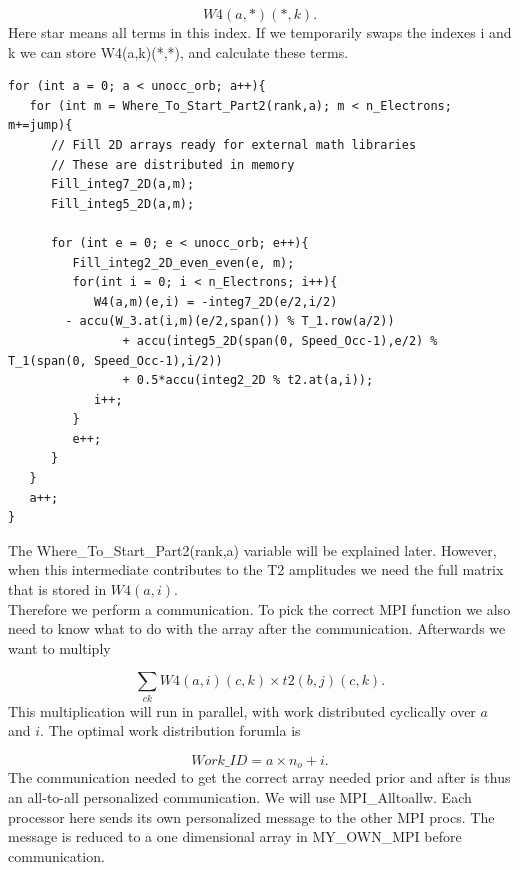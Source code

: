 \documentclass[a4paper,norsk,11pt,twoside]{report}
\begin{document}
\begin{equation}
W4(a,*)(*,k) .
\end{equation}
Here star means all terms in this index. If we temporarily swaps the indexes i and k we can store W4(a,k)(*,*), and calculate these terms.

\begin{lstlisting}
for (int a = 0; a < unocc_orb; a++){
   for (int m = Where_To_Start_Part2(rank,a); m < n_Electrons; m+=jump){
      // Fill 2D arrays ready for external math libraries
      // These are distributed in memory
      Fill_integ7_2D(a,m);
      Fill_integ5_2D(a,m);

      for (int e = 0; e < unocc_orb; e++){
         Fill_integ2_2D_even_even(e, m);
         for(int i = 0; i < n_Electrons; i++){
            W4(a,m)(e,i) = -integ7_2D(e/2,i/2)
        - accu(W_3.at(i,m)(e/2,span()) % T_1.row(a/2))
                + accu(integ5_2D(span(0, Speed_Occ-1),e/2) % T_1(span(0, Speed_Occ-1),i/2))
                + 0.5*accu(integ2_2D % t2.at(a,i));
            i++;
         }
         e++;
      }
   }
   a++;
}
\end{lstlisting}

The Where\_To\_Start\_Part2(rank,a) variable will be explained later. However, when this intermediate contributes to the T2 amplitudes we need the full matrix that is stored in $W4(a,i)$. \\

Therefore we perform a communication. To pick the correct MPI function we also need to know what to do with the array after the communication. Afterwards we want to multiply

\begin{equation}
\sum_{ck} W4(a,i)(c,k) \times t2(b,j)(c,k)   .\label{gasghashkashfbdbhcxxcnxcruu}
\end{equation}
This multiplication will run in parallel, with work distributed cyclically over $a$ and $i$. The optimal work distribution forumla is

\begin{equation}
Work\_ID = a \times n_o + i .
\end{equation}
The communication needed to get the correct array needed prior and after is thus an all-to-all personalized communication. We will use MPI\_Alltoallw. Each processor here sends its own personalized message to the other MPI procs. The message is reduced to a one dimensional array in MY\_OWN\_MPI before communication. \\
\end{document}
